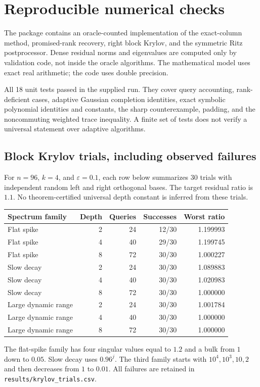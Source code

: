 \documentclass[11pt]{article}
\numberwithin{equation}{section}
\theoremstyle{definition}
\newcommand{\eps}{\varepsilon}
\newcommand{\code}[1]{\texttt{#1}}
\begin{document}
\section{Reproducible numerical checks}
\label{sec:experiments}

The package contains an oracle-counted implementation of the exact-column
method, promised-rank recovery, right block Krylov, and the symmetric Ritz
postprocessor. Dense residual norms and eigenvalues are computed only by
validation code, not inside the oracle algorithms. The mathematical model
uses exact real arithmetic; the code uses double precision.

All 18 unit tests passed in the supplied run. They cover query accounting,
rank-deficient cases, adaptive Gaussian completion identities, exact symbolic
polynomial identities and constants, the sharp counterexample, padding,
and the noncommuting weighted trace inequality. A finite set of tests does
not verify a universal statement over adaptive algorithms.

\subsection{Block Krylov trials, including observed failures}
For $n=96$, $k=4$, and $\eps=0.1$, each row below summarizes 30 trials with
independent random left and right orthogonal bases. The target residual
ratio is $1.1$. No theorem-certified universal depth constant is inferred
from these trials.

\begin{center}
\small
\begin{tabular}{@{}lrrrr@{}}
\toprule
Spectrum family & Depth & Queries & Successes & Worst ratio\\
\midrule
Flat spike & 2 & 24 & 12/30 & 1.199993\\
Flat spike & 4 & 40 & 29/30 & 1.199745\\
Flat spike & 8 & 72 & 30/30 & 1.000227\\
Slow decay & 2 & 24 & 30/30 & 1.089883\\
Slow decay & 4 & 40 & 30/30 & 1.020983\\
Slow decay & 8 & 72 & 30/30 & 1.000000\\
Large dynamic range & 2 & 24 & 30/30 & 1.001784\\
Large dynamic range & 4 & 40 & 30/30 & 1.000000\\
Large dynamic range & 8 & 72 & 30/30 & 1.000000\\
\bottomrule
\end{tabular}
\end{center}
The flat-spike family has four singular values equal to $1.2$ and a bulk
from $1$ down to $0.05$. Slow decay uses $0.96^j$. The third family starts
with $10^4,10^3,10,2$ and then decreases from $1$ to $0.01$.
All failures are retained in \code{results/krylov\_trials.csv}.
\end{document}

